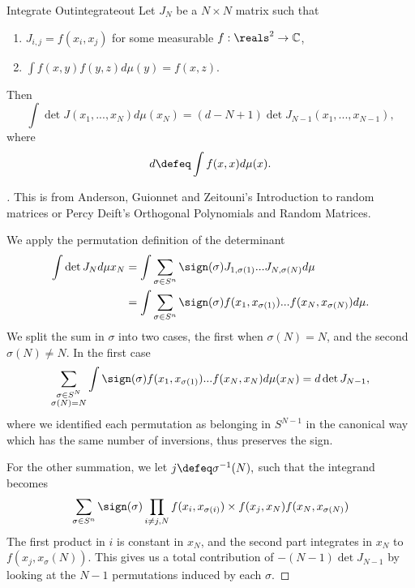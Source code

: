 \begin{alemma}{Integrate Out}{integrateout}
    Let $J_N$ be a $N\times N$ matrix such that \begin{enumerate}
        \item $J_{i,j} = f(x_i,x_j)$ for some measurable $f: \reals^2\to \mathbb{C}$,
        \item $\int f(x,y)f(y,z)d\mu(y) =f(x,z)$.
    \end{enumerate}
    Then \[
    \int \det J(x_1,...,x_N) d\mu(x_N) = (d-N+1) \det J_{N-1} (x_1,...,x_{N-1}),
    \]
    where \[
    d \defeq \int f(x,x) d\mu(x).
    \]
\end{alemma}
\begin{proof}[]
    This is from Anderson, Guionnet and Zeitouni's Introduction to random matrices or Percy Deift's Orthogonal Polynomials and Random Matrices. 

    We apply the permutation definition of the determinant \begin{align*}
        \int \det J_N d\mu x_N &= \int \sum_{\sigma \in S^n} \sign (\sigma) J_{1,\sigma(1)}...J_{N,\sigma(N)} d\mu \\
       &=  \int \sum_{\sigma \in S^n}\sign (\sigma)
        f(x_1,x_{\sigma(1)})...f(x_N,x_{\sigma(N)}) d\mu.
    \end{align*}
    We split the sum in $\sigma$ into two cases, the first when $\sigma(N)=N$, and the second $\sigma(N)\neq N$.
    In the first case \[
    \sum_{\substack{\sigma\in S^N\\ \sigma(N)=N}}\int
    \sign (\sigma) f(x_1,x_{\sigma(1)})...f(x_N,x_N) d\mu(x_N) = d \det J_{N-1},
    \]
    where we identified each permutation as belonging in $S^{N-1}$ in the canonical way which has the same number of inversions, thus preserves the sign. 

    For the other summation, we let $j \defeq \sigma^{-1}(N),$ such that the integrand becomes \[
    \sum_{\sigma \in S^n}\sign (\sigma) \prod_{i\neq j,N}
        f(x_i,x_{\sigma(i)}) \times f(x_j,x_N) f(x_N,x_{\sigma(N)})
    \]
    The first product in $i$ is constant in $x_N$, and the second part integrates in $x_N$ to $f(x_j, x_\sigma(N))$. This gives us a total contribution of $-(N-1)\det J_{N-1}$ by looking at the $N-1$ permutations induced by each $\sigma$.
\end{proof}


